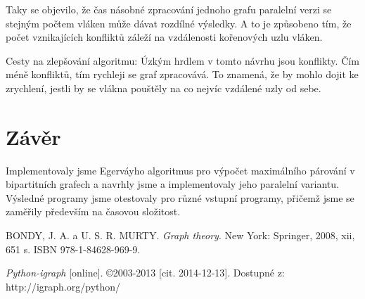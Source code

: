 \documentclass[a4paper, 11pt, titlepage, final]{article}[3. prosinec 2011]
\begin{document}
Taky se objevilo, že čas násobné zpracování jednoho grafu paralelní verzi se stejným počtem vláken může dávat rozdílné výsledky. A to je způsobeno tím, že počet vznikajících konfliktů záleží na vzdálenosti kořenových uzlu vláken.

Cesty na zlepšování algoritmu:
    Úzkým hrdlem v tomto návrhu jsou konflikty. Čím méně konfliktů, tím rychleji se graf zpracovává. To znamená, že by mohlo dojit ke zrychlení, jestli by se vlákna pouštěly na co nejvíc vzdálené uzly od sebe.

\section{Závěr}

Implementovaly jsme Egerváyho algoritmus pro výpočet maximálního párování v bipartitních grafech a navrhly jsme a implementovaly jeho paralelní variantu. Výsledné programy jsme otestovaly pro různé vstupní programy, přičemž jsme se zaměřily především na časovou složitost.

\begin{thebibliography}{1}
  
   BONDY, J. A. a U. S. R. MURTY. \emph{Graph theory}. New York: Springer, 2008, xii, 651 s. ISBN 978-1-84628-969-9. 
  
   \emph{Python-igraph} [online]. \copyright 2003-2013 [cit. 2014-12-13]. Dostupné z: http://igraph.org/python/ 

\end{thebibliography}


\end{document}
